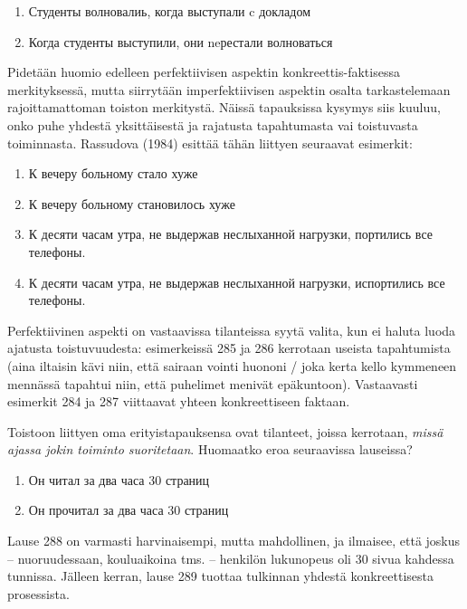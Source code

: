 \documentclass[]{scrartcl}
\providecommand{\tightlist}{%
  \setlength{\itemsep}{0pt}\setlength{\parskip}{0pt}}
\begin{document}
\begin{enumerate}
\def\labelenumi{(\arabic{enumi})}
\setcounter{enumi}{281}
\tightlist
\item
  Студенты волновалиь, когда выступали c докладом
\item
  Когда студенты выступили, они neрестали волноваться
\end{enumerate}

Pidetään huomio edelleen perfektiivisen aspektin konkreettis-faktisessa
merkityksessä, mutta siirrytään imperfektiivisen aspektin osalta
tarkastelemaan rajoittamattoman toiston merkitystä. Näissä tapauksissa
kysymys siis kuuluu, onko puhe yhdestä yksittäisestä ja rajatusta
tapahtumasta vai toistuvasta toiminnasta. Rassudova (1984) esittää tähän
liittyen seuraavat esimerkit:

\begin{enumerate}
\def\labelenumi{(\arabic{enumi})}
\setcounter{enumi}{283}
\tightlist
\item
  К вечеру больному стало хуже
\item
  К вечеру больному становилось хуже
\item
  К десяти часам утра, не выдержав неслыханной нагрузки, портились все
  телефоны.
\item
  К десяти часам утра, не выдержав неслыханной нагрузки, испортились все
  телефоны.
\end{enumerate}

Perfektiivinen aspekti on vastaavissa tilanteissa syytä valita, kun ei
haluta luoda ajatusta toistuvuudesta: esimerkeissä 285 ja 286 kerrotaan
useista tapahtumista (aina iltaisin kävi niin, että sairaan vointi
huononi / joka kerta kello kymmeneen mennässä tapahtui niin, että
puhelimet menivät epäkuntoon). Vastaavasti esimerkit 284 ja 287
viittaavat yhteen konkreettiseen faktaan.

Toistoon liittyen oma erityistapauksensa ovat tilanteet, joissa
kerrotaan, \emph{missä ajassa jokin toiminto suoritetaan}. Huomaatko
eroa seuraavissa lauseissa?

\begin{enumerate}
\def\labelenumi{(\arabic{enumi})}
\setcounter{enumi}{287}
\tightlist
\item
  Он читал за два часа 30 страниц
\item
  Он прочитал за два часа 30 страниц
\end{enumerate}

Lause 288 on varmasti harvinaisempi, mutta mahdollinen, ja ilmaisee,
että joskus -- nuoruudessaan, kouluaikoina tms. -- henkilön lukunopeus
oli 30 sivua kahdessa tunnissa. Jälleen kerran, lause 289 tuottaa
tulkinnan yhdestä konkreettisesta prosessista.
\end{document}
